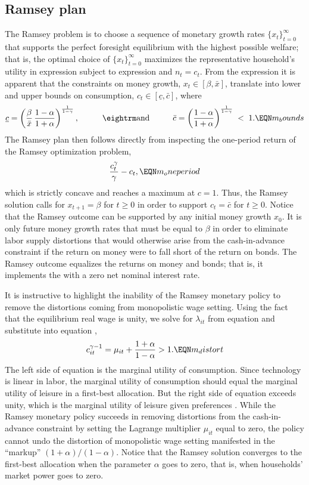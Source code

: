 \subsection{Ramsey plan}
The Ramsey problem is to choose a sequence of monetary growth rates
$\{x_t\}_{t=0}^\infty$
that supports the perfect foresight equilibrium with the highest possible
welfare; that is, the optimal choice of $\{x_t\}_{t=0}^\infty$
maximizes the representative household's utility in expression 
subject to expression  and $n_t=c_t$.
From the expression  it is apparent that
the constraints on money growth, $x_t \in [\beta, \bar x]$, translate into
 lower and  upper bounds on consumption,
$c_t \in [\underline c, \bar c]$, where
$$
\underline c = \left({\beta \over \bar x} \, {1-\alpha \over 1+\alpha}
                            \right)^{1 \over 1-\gamma}, \hskip1cm
\hbox{\rm and} \hskip1cm
\bar c = \left( {1-\alpha \over 1+\alpha}
                          \right)^{1 \over 1-\gamma} \;<\;1.   \EQN m_bounds
$$
The Ramsey plan then follows directly from inspecting the one-period return
of the Ramsey optimization problem,
$$
 {c_{t}^{\gamma} \over \gamma } -c_{t},                        \EQN m_oneperiod
$$
which is strictly concave and reaches a maximum at $c=1$. Thus,
the Ramsey solution calls for $x_{t+1}=\beta$ for $t\geq 0$
in order to support $c_t=\bar c$ for $t\geq 0$. Notice that the Ramsey
outcome can be supported by any initial money growth $x_0$. It is only future
money growth rates that must be equal to $\beta$ in order to eliminate labor
supply distortions that would otherwise arise from the cash-in-advance
constraint if the return on money were to fall short of the return
on bonds. The Ramsey outcome equalizes the returns on money and
bonds; that is, it implements the  with a zero net
nominal interest rate.


It is instructive to highlight the inability of the Ramsey monetary policy
to remove the distortions coming from monopolistic wage setting. Using the
fact that the equilibrium real wage is unity, we solve for $\lambda_{it}$ from
equation  and substitute into equation ,
$$
c_{it}^{\gamma -1} = \mu_{it} + {1+ \alpha \over 1- \alpha} > 1.   \EQN m_distort
$$
The left side of equation  is the marginal utility of
consumption.
Since technology  is linear in labor, the marginal utility of
consumption should equal the marginal utility of leisure in a first-best
allocation.  But the right side of equation  exceeds unity,
which is the marginal utility of leisure given preferences .
While the Ramsey monetary policy succeeds in removing distortions
from the cash-in-advance constraint by setting the
Lagrange multiplier $\mu_{it}$ equal to zero, the policy cannot
undo the distortion of monopolistic wage setting manifested in the
``markup'' $(1+ \alpha)/(1- \alpha)$. Notice that the Ramsey
solution converges to the first-best allocation when the parameter
$\alpha$ goes to zero, that is, when households' market power goes to zero.


